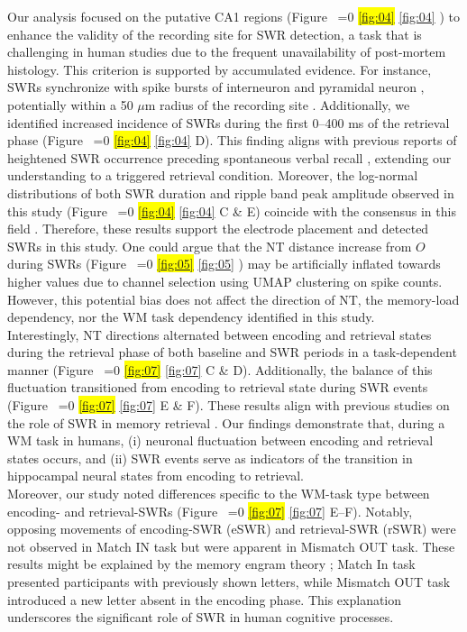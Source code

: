 \documentclass[preprint,review,12pt]{elsarticle}%
\newcommand{\hl}[1]{\colorbox{yellow}{#1}}
\newcommand{\hlref}[1]{%
  \ifnum\getrefnumber{#1}=0
    \hl{\ref*{#1}}%
  \else
    \ref{#1}%
  \fi
}
\begin{document}
\indent
Our analysis focused on the putative CA1 regions (Figure~\hlref{fig:04}) to enhance the validity of the recording site for SWR detection, a task that is challenging in human studies due to the frequent unavailability of post-mortem histology. This criterion is supported by accumulated evidence. For instance, SWRs synchronize with spike bursts of interneuron and pyramidal neuron \cite{buzsaki_two-stage_1989, quyen_cell_2008, royer_control_2012, hajos_input-output_2013}, potentially within a 50 $\mu$m radius of the recording site \cite{schomburg_spiking_2012}. Additionally, we identified increased incidence of SWRs during the first 0--400 ms of the retrieval phase (Figure~\hlref{fig:04}D). This finding aligns with previous reports of heightened SWR occurrence preceding spontaneous verbal recall \cite{norman_hippocampal_2019, norman_hippocampal_2021}, extending our understanding to a triggered retrieval condition. Moreover, the log-normal distributions of both SWR duration and ripple band peak amplitude observed in this study (Figure~\hlref{fig:04}C \& E) coincide with the consensus in this field \cite{liu_consensus_2022}. Therefore, these results support the electrode placement and detected SWRs in this study. One could argue that the NT distance increase from $O$ during SWRs (Figure~\hlref{fig:05}) may be artificially inflated towards higher values due to channel selection using UMAP clustering on spike counts. However, this potential bias does not affect the direction of NT, the memory-load dependency, nor the WM task dependency identified in this study.\\
\indent
Interestingly, NT directions alternated between encoding and retrieval states during the retrieval phase of both baseline and SWR periods in a task-dependent manner (Figure~\hlref{fig:07}C \& D). Additionally, the balance of this fluctuation transitioned from encoding to retrieval state during SWR events (Figure~\hlref{fig:07} E \& F). These results align with previous studies on the role of SWR in memory retrieval \cite{norman_hippocampal_2019, norman_hippocampal_2021}. Our findings demonstrate that, during a WM task in humans, (i) neuronal fluctuation between encoding and retrieval states occurs, and (ii) SWR events serve as indicators of the transition in hippocampal neural states from encoding to retrieval.\\
\indent
Moreover, our study noted differences specific to the WM-task type between encoding- and retrieval-SWRs (Figure~\hlref{fig:07}E--F). Notably, opposing movements of encoding-SWR (eSWR) and retrieval-SWR (rSWR) were not observed in Match IN task but were apparent in Mismatch OUT task. These results might be explained by the memory engram theory \cite{liu_optogenetic_2012}; Match In task presented participants with previously shown letters, while Mismatch OUT task introduced a new letter absent in the encoding phase. This explanation underscores the significant role of SWR in human cognitive processes.\\
\end{document}
